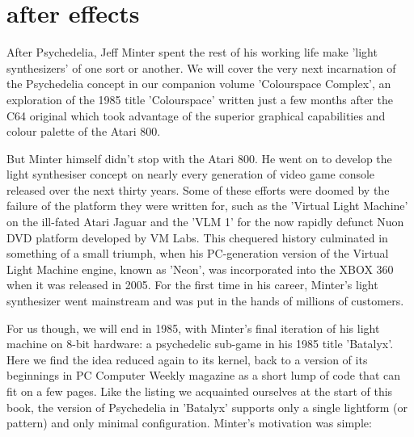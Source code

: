 \chapter{after effects} 
\label{sec:patterns}
\rhead[]{\leftmark}
\lstset{style=6502Style}
\lstset{ 
   aboveskip=5pt,
   belowskip=0pt,
}
After Psychedelia, Jeff Minter spent the rest of his working life make 'light synthesizers' of one sort or another. We will cover the very next incarnation of the
Psychedelia concept in our companion volume 'Colourspace Complex', an exploration of the 1985 title 'Colourspace' written just a few months after the C64 original
which took advantage of the superior graphical capabilities and colour palette of the Atari 800. 

But Minter himself didn't stop with the Atari 800. He went on to develop the light
synthesiser concept on nearly every generation of video game console released
over the next thirty years. Some of these efforts were doomed by the failure of
the platform they were written for, such as the 'Virtual Light Machine' on the
ill-fated Atari Jaguar and the 'VLM 1' for the now rapidly defunct Nuon DVD platform developed by
VM Labs. This chequered history culminated in something of a small triumph, when his PC-generation version of the Virtual Light Machine engine, known as 'Neon',
was incorporated into the XBOX 360 when it was released in 2005. For the first time in his career, Minter's light synthesizer went mainstream and was put in the
hands of millions of customers.

For us though, we will end in 1985, with Minter's final iteration of his light machine on 8-bit hardware: a psychedelic sub-game in his 1985 title 'Batalyx'. Here
we find the idea reduced again to its kernel, back to a version of its beginnings in PC Computer Weekly magazine as a short lump of code that can fit on a few pages.
Like the listing we acquainted ourselves at the start of this book, the version of Psychedelia in 'Batalyx' supports only a single lightform (or pattern) and only
minimal configuration. Minter's motivation was simple:



